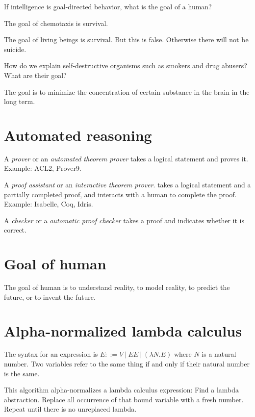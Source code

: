 If intelligence is goal-directed behavior, what is the goal of a human?

The goal of chemotaxis is survival.

The goal of living beings is survival.
But this is false. Otherwise there will not be suicide.

How do we explain self-destructive organisms such as smokers and drug abusers?
What are their goal?

The goal is to minimize the concentration of certain substance in the brain in the long term.

\section{Automated reasoning}


A \emph{prover} or an \emph{automated theorem prover} takes a logical statement
and proves it.
Example: ACL2, Prover9.

A \emph{proof assistant}
or an \emph{interactive theorem prover}.
takes a logical statement and a partially completed proof,
and interacts with a human to complete the proof.
Example: Isabelle, Coq, Idris.

A \emph{checker} or a \emph{automatic proof checker} takes a proof and indicates whether it is correct.

\section{Goal of human}

The goal of human is to understand reality, to model reality, to predict the future, or to invent the future.

\section{Alpha-normalized lambda calculus}

The syntax for an expression is \(E ::= V ~|~ EE ~|~ (\lambda N . E) \)
where \(N\) is a natural number.
Two variables refer to the same thing if and only if their natural number is the same.

This algorithm alpha-normalizes a lambda calculus expression:
Find a lambda abstraction.
Replace all occurrence of that bound variable with a fresh number.
Repeat until there is no unreplaced lambda.

